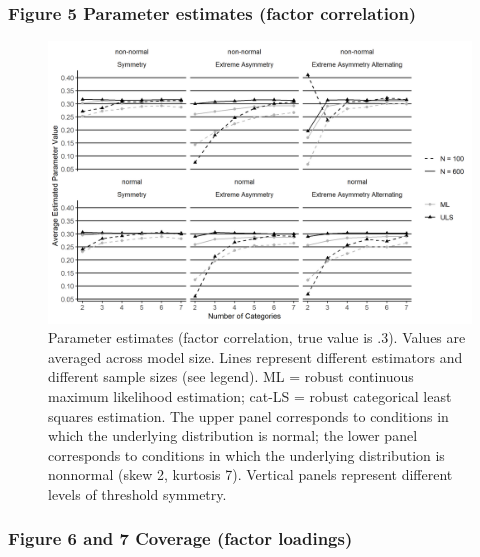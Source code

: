 \documentclass[10,a4paperpaper,]{article}
\begin{document}
\subsubsection{Figure 5 Parameter estimates (factor correlation)}

\begin{figure}
\includegraphics[width=445pt]{./figures/fig_5} \caption{Parameter estimates (factor correlation, true value is .3). Values are averaged across model size. Lines represent different estimators and different sample sizes (see legend). ML = robust continuous maximum likelihood estimation; cat-LS = robust categorical least squares estimation. The upper panel corresponds to conditions in which the underlying distribution is normal; the lower panel corresponds to conditions in which the underlying distribution is nonnormal (skew 2, kurtosis 7). Vertical panels represent different levels of threshold symmetry.}\label{fig:unnamed-chunk-4}
\end{figure}

\subsubsection{Figure 6 and 7 Coverage (factor loadings)}
\end{document}
